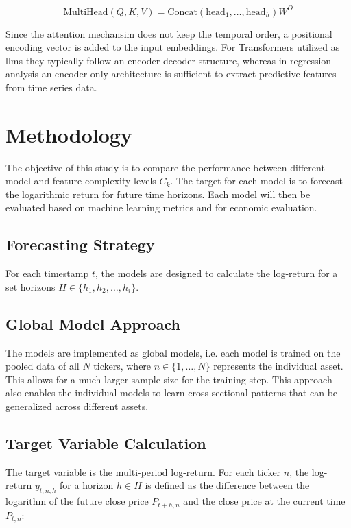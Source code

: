 \documentclass[12pt,twoside=false,a4paper,parskip]{scrbook}
\begin{document}
\begin{equation}
    \text{MultiHead}(Q, K, V) = \text{Concat}(\text{head}_1, \dots, \text{head}_h)W^O
\end{equation}

Since the attention mechansim does not keep the temporal order, a positional encoding vector is added to the input embeddings. 
For Transformers utilized as \gls{llm}s they typically follow an encoder-decoder structure, whereas in regression analysis an encoder-only architecture is sufficient to extract predictive features from time series data. 



\chapter{Methodology}
\label{ch:methodology}
The objective of this study is to compare the performance between different model  and feature complexity levels $C_k$. The target for each model is to forecast the logarithmic return for future time horizons. Each model will then be evaluated based on machine learning metrics and for economic evaluation.

\section{Forecasting Strategy}
For each timestamp $t$, the models are designed to calculate the log-return for a set horizons $H \in \{h_1, h_2, \dots, h_i\}$. 

\section{Global Model Approach}
The models are implemented as global models, i.e. each model is trained on the pooled data of all $N$ tickers, where $n \in \{1, \dots, N\}$ represents the individual asset. This allows for a much larger sample size for the training step. This approach also enables the individual models to learn cross-sectional patterns that can be generalized across different assets.

\section{Target Variable Calculation}
The target variable  is the multi-period log-return. For each ticker $n$, the log-return  $y_{t,n,h}$ for a horizon $h \in H$ is defined as the difference between the logarithm of the future close price $P_{t+h, n}$ and the close price at the current time $P_{t, n}$:
\end{document}
